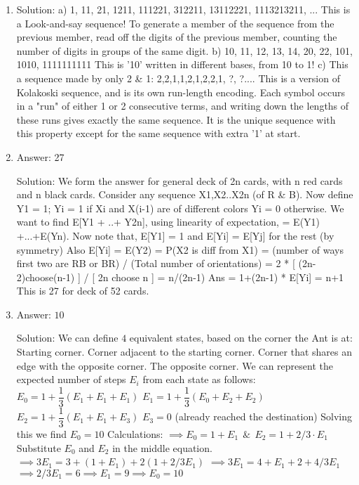 \begin{enumerate}
\item
Solution: a) 1, 11, 21, 1211, 111221, 312211, 13112221, 1113213211, ...
This is a Look-and-say sequence! To generate a member of the sequence from the previous member, read off the digits of the previous member, counting the number of digits in groups of the same digit.
b) 10, 11, 12, 13, 14, 20, 22, 101, 1010, 1111111111
This is '10' written in different bases, from 10 to 1!
c) This a sequence made by only 2 \& 1: 2,2,1,1,2,1,2,2,1, ?, ?....
This is a version of Kolakoski sequence, and is its own run-length encoding. Each symbol occurs in a "run" of either 1 or 2 consecutive terms, and writing down the lengths of these runs gives exactly the same sequence. It is the unique sequence with this property except for the same sequence with extra '1' at start.




\item
Answer: 27
 
Solution: We form the answer for general deck of 2n cards, with n red cards and n black cards. Consider any sequence X1,X2..X2n (of R \& B). Now define  Y1 = 1;
Yi = 1 if Xi and X(i-1) are of different colors
Yi = 0 otherwise.
We want to find E[Y1 + ..+ Y2n], using linearity of expectation, = E(Y1) +...+E(Yn). Now note that, E[Y1] = 1 and E[Yi] = E[Yj] for the rest (by symmetry)
Also E[Yi] = E(Y2) = P(X2 is diff from X1) =  (number of ways first two are RB or BR) / (Total number of orientations) = 2 * [ (2n-2)choose(n-1) ] / [ 2n choose n ] = n/(2n-1)
Ans = 1+(2n-1) * E[Yi] = n+1
This is 27 for deck of 52 cards.




\item
Answer: $10$
 
Solution: We can define $4$ equivalent states, based on the corner the Ant is at:
Starting corner.
Corner adjacent to the starting corner.
Corner that shares an edge with the opposite corner.
The opposite corner.
We can represent the expected number of steps $E_i$ from each state as follows:
$E_0 = 1 + \dfrac{1}{3}(E_1 + E_1 + E_1)$
$E_1 = 1 + \dfrac{1}{3} (E_0 + E_2 + E_2)$
$E_2 = 1 + \dfrac{1}{3}(E_1 + E_1 + E_3)$
$E_3 = 0$ (already reached the destination)
Solving this we find $E_0 = 10$
Calculations:
$\implies E_0 = 1 + E_1  ~~\&~~ E_2 = 1 + 2/3 \cdot E_1$
Substitute $E_0$ and $E_2$ in the middle equation.
$\implies 3E_1 = 3 + (1 + E_1) + 2 (1 + 2/3 E_1)$
$\implies 3E_1 = 4 + E_1 + 2 + 4/3 E_1$
$\implies 2/3 E_1 = 6 \implies E_1=9 \implies E_0 = 10$




\end{enumerate}
